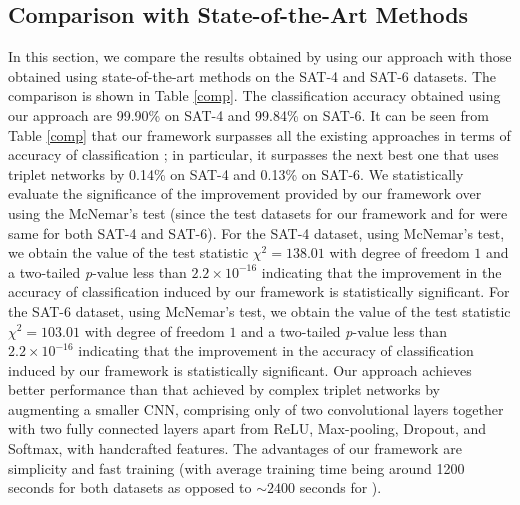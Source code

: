 \documentclass[]{interact}
\theoremstyle{plain}\newtheorem{theorem}{Theorem}[section]
\theoremstyle{definition}
\theoremstyle{remark}
\begin{document}
\subsection{Comparison with State-of-the-Art Methods}
In this section, we compare the results obtained by using our  approach  with those obtained using   state-of-the-art methods  on  the SAT-4 and SAT-6 datasets. The comparison is  shown in Table \ref{comp}. The classification accuracy obtained using  our approach are 99.90\% on SAT-4 and 99.84\% on SAT-6.   
It can be seen from Table \ref{comp} that  our framework surpasses all the existing approaches in terms of accuracy of classification  \citep{basu2015,simo2015discriminative,zhong2017satcnn,ma2016satellite,gong2018diversity, liu2018scene}; in particular, it surpasses  the next best one \citep{liu2018scene}  that uses triplet networks by 0.14\% on SAT-4 and 0.13\% on SAT-6. We statistically evaluate the significance of the improvement provided by our framework over \citep{liu2018scene} using the McNemar's test (since the test datasets for  our framework and for \citep{liu2018scene} were same for both SAT-4 and SAT-6). For the SAT-4 dataset, using McNemar's test, we obtain  the value of the test statistic $\chi^2 = 138.01$ with degree of freedom $1$ and a two-tailed \textit{p}-value less than $2.2 \times 10^{-16}$ indicating that the improvement in the accuracy of classification induced by our framework is statistically significant.  For the SAT-6 dataset, using McNemar's test, we obtain  the value of the test statistic $\chi^2 = 103.01$ with degree of freedom $1$ and a two-tailed \textit{p}-value less than $2.2 \times 10^{-16}$ indicating that the improvement in the accuracy of classification induced by our framework is statistically significant. Our approach achieves better performance than that achieved by  complex triplet networks \citep{liu2018scene}  by augmenting  a smaller  CNN,  comprising  only  of  two convolutional layers together with  two fully connected  layers apart from  ReLU, Max-pooling, Dropout, and Softmax, with handcrafted features. The advantages of our framework are simplicity and fast training (with average training time being around 1200 seconds for both datasets as opposed to ${\sim}2400$ seconds for \citep{zhong2017satcnn}). 
\end{document}
